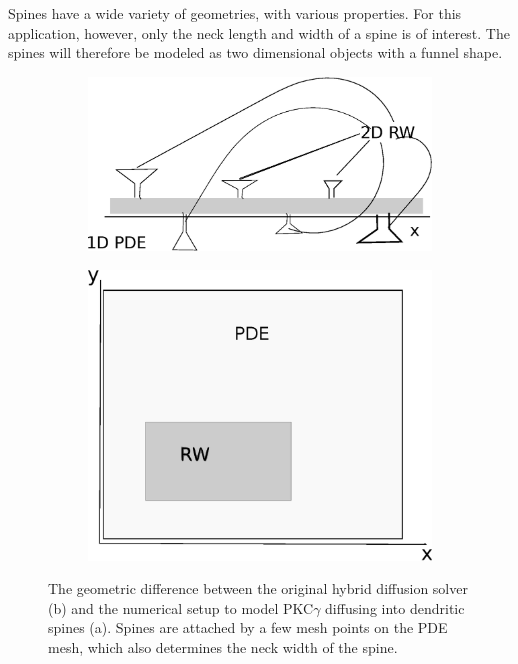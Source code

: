 \noindent Spines have a wide variety of geometries, with various properties. For this application, however, only the neck length and width of a spine is of interest. The spines will therefore be modeled as two dimensional objects with a funnel shape. 
\begin{figure}[H]
 \centering
 \begin{subfigure}{0.48\textwidth}
  \includegraphics[width=\textwidth]{Figures/dendrite_spine_model.eps}
  \caption{}
 \end{subfigure}
 \begin{subfigure}{0.48\textwidth}
  \includegraphics[width=\textwidth]{Figures/hybrid_model_principle.eps}
  \caption{}
 \end{subfigure}
 \caption[Difference between hybrid diffusion solver and dendrite - spine diffusion model]{The geometric difference between the original hybrid diffusion solver (b) and the numerical setup to model PKC$\gamma$ diffusing into dendritic spines (a). Spines are attached by a few mesh points on the PDE mesh, which also determines the neck width of the spine.}
 \label{application:geometry_difference}
\end{figure}

